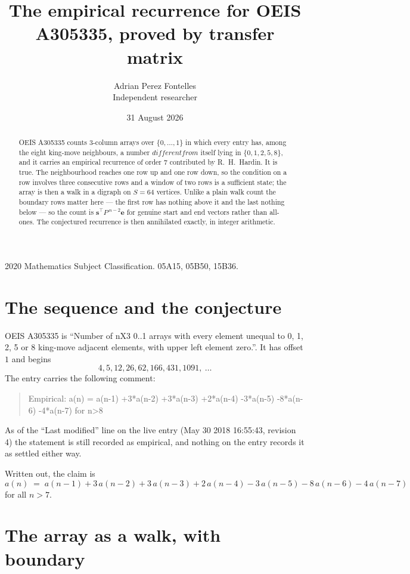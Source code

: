 \documentclass[11pt,a4paper]{article}
\title{The empirical recurrence for OEIS A305335, proved by transfer matrix}
\author{Adrian Perez Fontelles\\ \small Independent researcher}
\date{31 August 2026}
\theoremstyle{plain}
\theoremstyle{definition}
\begin{document}
\maketitle

\begin{abstract}
OEIS A305335 counts $3$-column arrays over $\{0,\dots,1\}$ in which every entry has,
among the eight king-move neighbours, a number $different from$ itself lying in $\{0,1,2,5,8\}$, and it carries an empirical
recurrence of order $7$ contributed by R.~H.~Hardin. It is true. The neighbourhood
reaches one row up and one row down, so the condition on a row involves three consecutive
rows and a window of two rows is a sufficient state; the array is then a walk in a digraph
on $S=64$ vertices. Unlike a plain walk count the boundary rows matter here --- the first
row has nothing above it and the last nothing below --- so the count is
$\mathbf{s}^{\!\top}P^{\,n-2}\mathbf{e}$ for genuine start and end vectors rather than
all-ones. The conjectured recurrence is then annihilated exactly, in integer arithmetic.
\end{abstract}

\noindent\small 2020 Mathematics Subject Classification. 05A15, 05B50, 15B36.\normalsize

\section{The sequence and the conjecture}

OEIS A305335 is ``Number of nX3 0..1 arrays with every element unequal to 0, 1, 2, 5 or 8 king-move adjacent elements, with upper left element zero.''. It has offset
$1$ and begins
\[
4, 5, 12, 26, 62, 166, 431, 1091,\ \dots
\]
The entry carries the following comment:
\begin{quote}\small
Empirical: a(n) = a(n-1) +3*a(n-2) +3*a(n-3) +2*a(n-4) -3*a(n-5) -8*a(n-6) -4*a(n-7) for n>8
\end{quote}
As of the ``Last modified'' line on the live entry (May 30 2018 16:55:43, revision
4) the statement is still recorded as empirical, and nothing on the entry
records it as settled either way.

Written out, the claim is
\begin{equation}\label{eq:conj}
a(n)\;=\;a(n-1) + 3\,a(n-2) + 3\,a(n-3) + 2\,a(n-4) - 3\,a(n-5) - 8\,a(n-6) - 4\,a(n-7)
\end{equation}
for all $n>7$.

\section{The array as a walk, with boundary}
\end{document}
